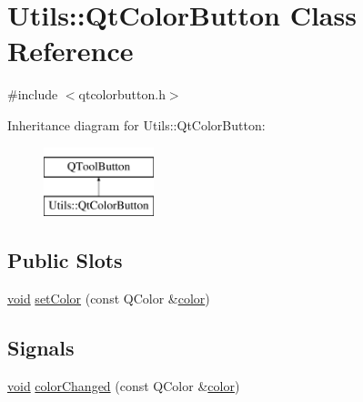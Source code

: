 \hypertarget{class_utils_1_1_qt_color_button}{\section{Utils\-:\-:Qt\-Color\-Button Class Reference}
\label{class_utils_1_1_qt_color_button}
}


{\ttfamily \#include $<$qtcolorbutton.\-h$>$}

Inheritance diagram for Utils\-:\-:Qt\-Color\-Button\-:\begin{figure}[H]
\begin{center}
\leavevmode
\includegraphics[height=2.000000cm]{class_utils_1_1_qt_color_button}
\end{center}
\end{figure}
\subsection*{Public Slots}
\begin{DoxyCompactItemize}
\item 
\hyperlink{group___u_a_v_objects_plugin_ga444cf2ff3f0ecbe028adce838d373f5c}{void} \hyperlink{class_utils_1_1_qt_color_button_a6d9dde2142473a73dc67b736feea3496}{set\-Color} (const Q\-Color \&\hyperlink{glext_8h_a3ea846f998d64f079b86052b6c4193a8}{color})
\end{DoxyCompactItemize}
\subsection*{Signals}
\begin{DoxyCompactItemize}
\item 
\hyperlink{group___u_a_v_objects_plugin_ga444cf2ff3f0ecbe028adce838d373f5c}{void} \hyperlink{class_utils_1_1_qt_color_button_a795089187f11a4615620dafa852246c9}{color\-Changed} (const Q\-Color \&\hyperlink{glext_8h_a3ea846f998d64f079b86052b6c4193a8}{color})
\end{DoxyCompactItemize}
